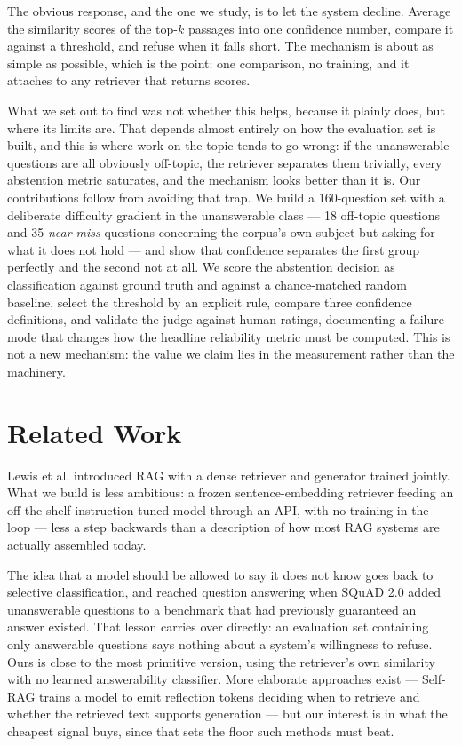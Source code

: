 \documentclass[conference]{IEEEtran}
\begin{document}
The obvious response, and the one we study, is to let the system decline. Average the similarity scores of the top-$k$ passages into one confidence number, compare it against a threshold, and refuse when it falls short. The mechanism is about as simple as possible, which is the point: one comparison, no training, and it attaches to any retriever that returns scores.

What we set out to find was not whether this helps, because it plainly does, but where its limits are. That depends almost entirely on how the evaluation set is built, and this is where work on the topic tends to go wrong: if the unanswerable questions are all obviously off-topic, the retriever separates them trivially, every abstention metric saturates, and the mechanism looks better than it is. Our contributions follow from avoiding that trap. We build a 160-question set with a deliberate difficulty gradient in the unanswerable class --- 18 off-topic questions and 35 \emph{near-miss} questions concerning the corpus's own subject but asking for what it does not hold --- and show that confidence separates the first group perfectly and the second not at all. We score the abstention decision as classification against ground truth and against a chance-matched random baseline, select the threshold by an explicit rule, compare three confidence definitions, and validate the judge against human ratings, documenting a failure mode that changes how the headline reliability metric must be computed. This is not a new mechanism: the value we claim lies in the measurement rather than the machinery.

\section{Related Work}

Lewis et al. \cite{lewis2020rag} introduced RAG with a dense retriever and generator trained jointly. What we build is less ambitious: a frozen sentence-embedding retriever feeding an off-the-shelf instruction-tuned model through an API, with no training in the loop --- less a step backwards than a description of how most RAG systems are actually assembled today.

The idea that a model should be allowed to say it does not know goes back to selective classification, and reached question answering when SQuAD 2.0 \cite{rajpurkar2018know} added unanswerable questions to a benchmark that had previously guaranteed an answer existed. That lesson carries over directly: an evaluation set containing only answerable questions says nothing about a system's willingness to refuse. Ours is close to the most primitive version, using the retriever's own similarity with no learned answerability classifier. More elaborate approaches exist --- Self-RAG \cite{asai2024selfrag} trains a model to emit reflection tokens deciding when to retrieve and whether the retrieved text supports generation --- but our interest is in what the cheapest signal buys, since that sets the floor such methods must beat.
\end{document}
